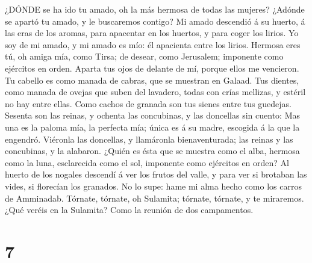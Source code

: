  ¿DÓNDE se ha ido tu amado, oh la más hermosa de todas las
mujeres? ¿Adónde se apartó tu amado, y le buscaremos contigo?
 Mi amado descendió á su huerto, á las eras de los aromas,
para apacentar en los huertos, y para coger los lirios.  Yo
soy de mi amado, y mi amado es mío: él apacienta entre los lirios.
 Hermosa eres tú, oh amiga mía, como Tirsa; de desear, como
Jerusalem; imponente como ejércitos en orden.  Aparta tus
ojos de delante de mí, porque ellos me vencieron. Tu cabello es como
manada de cabras, que se muestran en Galaad.  Tus dientes,
como manada de ovejas que suben del lavadero, todas con crías mellizas,
y estéril no hay entre ellas.  Como cachos de granada son
tus sienes entre tus guedejas.  Sesenta son las reinas, y
ochenta las concubinas, y las doncellas sin cuento:  Mas una
es la paloma mía, la perfecta mía; única es á su madre, escogida á la
que la engendró. Viéronla las doncellas, y llamáronla bienaventurada;
las reinas y las concubinas, y la alabaron.  ¿Quién es ésta
que se muestra como el alba, hermosa como la luna, esclarecida como el
sol, imponente como ejércitos en orden?  Al huerto de los
nogales descendí á ver los frutos del valle, y para ver si brotaban las
vides, si florecían los granados.  No lo supe: hame mi alma
hecho como los carros de Amminadab.  Tórnate, tórnate, oh
Sulamita; tórnate, tórnate, y te miraremos. ¿Qué veréis en la Sulamita?
Como la reunión de dos campamentos.

\hypertarget{section-6}{%
\section{7}\label{section-6}}


